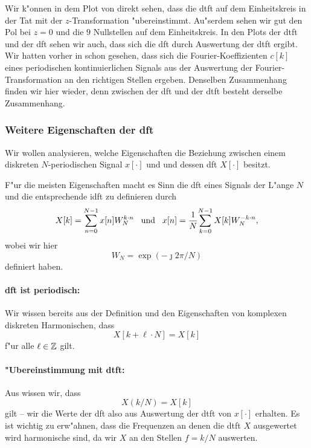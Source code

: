 Wir k"onnen in dem Plot von  direkt sehen, dass die \gls{dtft} auf dem Einheitskreis in der Tat mit der $z$-Transformation "ubereinstimmt.
Au"serdem sehen wir gut den Pol bei $z=0$ und die $9$ Nullstellen auf dem Einheitskreis.
In den Plots der \gls{dtft} und der \gls{dft} sehen wir auch, dass sich die \gls{dft} durch Auswertung der \gls{dtft} ergibt.
Wir hatten vorher in  schon gesehen, dass sich die Fourier-Koeffizienten $c[k]$ eines periodischen kontinuierlichen Signals aus der Auswertung der Fourier-Transformation an den richtigen Stellen ergeben.
Denselben Zusammenhang finden wir hier wieder, denn zwischen der \gls{dft} und der \gls{dtft} besteht derselbe Zusammenhang.
%
\FloatBarrier
\subsubsection{Weitere Eigenschaften der \texorpdfstring{\acrshort*{dft}}{DFT}}
%
Wir wollen analysieren, welche Eigenschaften die Beziehung zwischen einem diskreten $N$-periodischen Signal $x[\cdot]$ und und dessen \gls{dft} $X[\cdot]$ besitzt.

F"ur die meisten Eigenschaften macht es Sinn die \gls{dft} eines Signals der L"ange $N$ und die entsprechende \gls{idft} zu definieren durch
\begin{equation}\label{eq:fourier:dft_idft}
    X[k] = {\sum\limits_{n=0}^{N-1}{x[n] W_N^{k \cdot n}}}
    {\hspace{3mm} \text{und} \hspace{3mm}}
    x[n] = \frac{1}{N}{\sum\limits_{k=0}^{N-1}{X[k] W_N^{-k \cdot n}}},
\end{equation}
wobei wir hier 
\begin{equation}\label{eq:fourier:weights}
    W_N = \exp(-\jmath 2 \pi / N)
\end{equation} 
definiert haben.
%
%
\paragraph{\gls{dft} ist periodisch:} Wir wissen bereits aus der Definition und den Eigenschaften von komplexen diskreten Harmonischen, dass
\[
X[k + \ell \cdot N] = X[k]
\]
f"ur alle $\ell \in \mathbb{Z}$ gilt.
%
%
\paragraph{"Ubereinstimmung mit \gls{dtft}:} Aus  wissen wir, dass
\[
X(k/N) = X[k]
\]
gilt -- wir die Werte der \gls{dft} also aus Auswertung der \gls{dtft} von $x[\cdot]$ erhalten.
Es ist wichtig zu erw"ahnen, dass die Frequenzen an denen die \gls{dtft} $X$ ausgewertet wird harmonische  sind, da wir $X$ an den Stellen $f = k/N$ auswerten.
%
%
